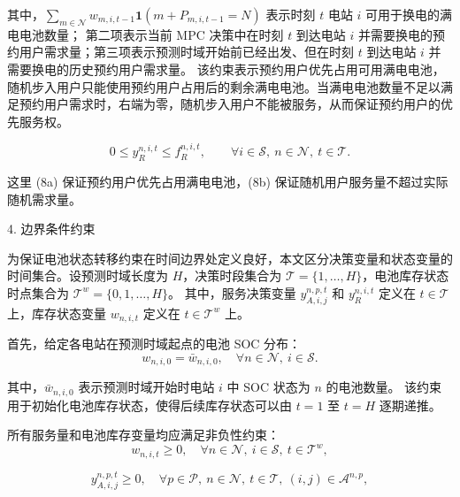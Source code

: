 \documentclass[12pt,hyperref,a4paper,UTF8]{ctexart}
\begin{document}
其中，$\sum_{m\in \mathcal{N}} w_{m,i,t-1}\mathbf{1}(m+P_{m,i,t-1}=N)$ 表示时刻 $t$ 电站 $i$ 可用于换电的满电电池数量；
第二项表示当前 MPC 决策中在时刻 $t$ 到达电站 $i$ 并需要换电的预约用户需求量；第三项表示预测时域开始前已经出发、但在时刻 $t$ 到达电站 $i$ 并需要换电的历史预约用户需求量。
该约束表示预约用户优先占用可用满电电池，随机步入用户只能使用预约用户占用后的剩余满电电池。当满电电池数量不足以满足预约用户需求时，右端为零，随机步入用户不能被服务，从而保证预约用户的优先服务权。


\begin{equation}
0\le y^{n,i,t}_{R}\le f^{n,i,t}_{R},
\qquad
\forall i\in \mathcal{S},\ n\in \mathcal{N},\ t\in \mathcal{T}.
\tag{8b}
\end{equation}

这里 (8a) 保证预约用户优先占用满电电池，(8b) 保证随机用户服务量不超过实际随机需求量。


4. 边界条件约束


为保证电池状态转移约束在时间边界处定义良好，本文区分决策变量和状态变量的时间集合。设预测时域长度为 $H$，决策时段集合为
$\mathcal{T}=\{1,\ldots,H\}$，电池库存状态时点集合为 $\mathcal{T}^{w}=\{0,1,\ldots,H\}$。
其中，服务决策变量 $y_{A,i,j}^{n,p,t}$ 和 $y_R^{n,i,t}$ 定义在 $t\in\mathcal{T}$ 上，库存状态变量 $w_{n,i,t}$ 定义在 $t\in\mathcal{T}^{w}$ 上。

首先，给定各电站在预测时域起点的电池 SOC 分布：
\begin{equation}
w_{n,i,0}=\bar{w}_{n,i,0},
\quad \forall n\in \mathcal{N},\ i\in \mathcal{S}.
\tag{9a}
\end{equation}

其中，$\bar{w}_{n,i,0}$ 表示预测时域开始时电站 $i$ 中 SOC 状态为 $n$ 的电池数量。
该约束用于初始化电池库存状态，使得后续库存状态可以由 $t=1$ 至 $t=H$ 逐期递推。


所有服务量和电池库存变量均应满足非负性约束：
\begin{equation}
w_{n,i,t}\ge 0,
\quad \forall n\in \mathcal{N},\ i\in \mathcal{S},\ t\in \mathcal{T}^{w},
\tag{9b}
\end{equation}

\begin{equation}
y^{n,p,t}_{A,i,j}\ge 0,
\quad \forall p\in \mathcal{P},\ n\in \mathcal{N},\ t\in \mathcal{T},\ (i,j)\in \mathcal{A}^{n,p},
\tag{9c}
\end{equation}
\end{document}
